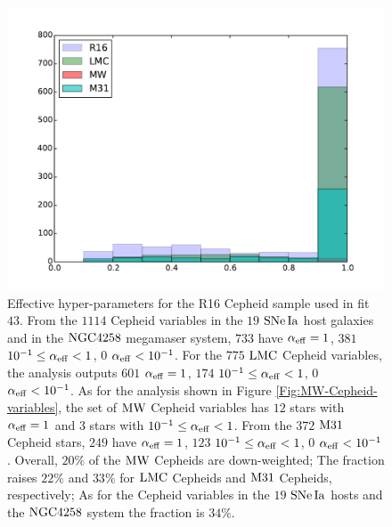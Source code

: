 \begin{figure}[hbtp]
\centering
\includegraphics[scale=0.75]{figures/chapter-h0/effective_HP_histogram_R16.pdf}
\caption{Effective hyper-parameters for the R16 Cepheid sample used in fit $43$. From the $1114$ Cepheid variables in the $19$ $\mathrm{SNe\,Ia}$ host galaxies and in the $\mathrm{NGC4258}$ megamaser system, $733$ have $\alpha_{\mathrm{eff}}=1$, $381$ $10^{-1}\leq \alpha_{\mathrm{eff}} < 1$, $0$   $\alpha_{\mathrm{eff}} < 10^{-1}$. For the $775$ $\mathrm{LMC}$ Cepheid variables, the analysis outputs $601$  $\alpha_{\mathrm{eff}}=1$, $174$ $10^{-1}\leq \alpha_{\mathrm{eff}} < 1$, $0$  $\alpha_{\mathrm{eff}} < 10^{-1}$. As for the analysis shown in Figure \ref{Fig:MW-Cepheid-variables}, the set of $\mathrm{MW}$ Cepheid variables has $12$ stars with $\alpha_{\mathrm{eff}}=1$ and $3$ stars with $10^{-1}\leq \alpha_{\mathrm{eff}} < 1$. From the $372$ $\mathrm{M31}$ Cepheid stars, $249$ have $\alpha_{\mathrm{eff}}=1$, $123$ $10^{-1}\leq \alpha_{\mathrm{eff}} < 1$, $0$   $\alpha_{\mathrm{eff}} < 10^{-1}$. Overall, $20\%$ of the $\mathrm{MW}$ Cepheids are down-weighted; The fraction raises $22\%$ and $33\%$  for $\mathrm{LMC}$ Cepheids and $\mathrm{M31}$ Cepheids, respectively; As for the Cepheid variables in the $19$ $\mathrm{SNe\,Ia}$ hosts and the $\mathrm{NGC4258}$ system the fraction is $34\%$.}
\label{Fig:effective-HP-fit-43}
\end{figure}

